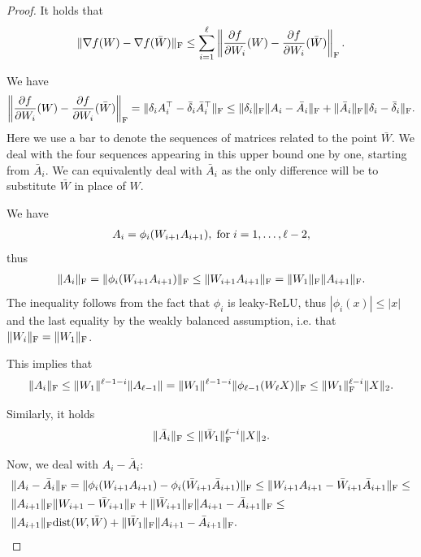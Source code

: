 \documentclass[a4paper,11pt]{article}
\newcommand{\1}{\mathbbm{1}}
\theoremstyle{plain}
\begin{document}
\begin{proof}
It holds that
\begin{equation*}
    \|\nabla f(W)-\nabla f(\bar W)\|_{\rm F} \leq \sum_{i=1}^{\ell} \left\|\frac{\partial f}{\partial W_i}(W)-\frac{\partial f}{\partial W_i}(\bar W) \right\|_{\rm F}.
\end{equation*}

We have
\begin{equation}
\label{eq:basic_bound_partial_derivatives}
    \left\|\frac{\partial f}{\partial W_i}(W)-\frac{\partial f}{\partial W_i}(\bar W) \right\|_{\rm F} = \|\delta_i A_i^\top - \bar \delta_i \bar A_i^\top\|_{\rm F} \leq \|\delta_i\|_{\rm F} \|A_i-\bar A_i\|_{\rm F}+\|\bar A_i\|_{\rm F} \|\delta_i-\bar \delta_i\|_{\rm F}.
\end{equation}
Here we use a bar to denote the sequences of matrices related to the point $\bar W$. We deal with the four sequences appearing in this upper bound one by one, starting from $\bar A_i$. We can equivalently deal with $\bar A_i$ as the only difference will be to substitute $\bar W$ in place of $W$.

We have
\begin{align*}
    A_i =  \phi_i(W_{i+1}A_{i+1}), \hspace{1mm} \text{for} \hspace{1mm} i=1, \dots ,\ell-2,
\end{align*}
 thus
\begin{align*}
    \|A_i\|_{\rm F} =  \|\phi_i(W_{i+1}A_{i+1})\|_{\rm F} \leq \|W_{i+1} A_{i+1}\|_{\rm F} = \|W_1\|_{\rm F} \|A_{i+1}\|_{\rm F}. 
\end{align*}
The inequality follows from the fact that $\phi_i$ is leaky-ReLU, thus $|\phi_i(x)| \leq |x|$ and the last equality by the weakly balanced assumption, i.e. that $\|W_i\|_{\rm F} = \|W_1\|_{\rm F}$.

This implies that
\begin{equation}
\label{eq:bound_A_i}
    \|A_i\|_{\rm F} \leq \|W_1\|^{\ell-1-i} \|A_{\ell-1}\| = \|W_1\|^{\ell-1-i} \|\phi_{\ell-1}(W_{\ell} X)\|_{\rm F} \leq \|W_1\|_{\rm F}^{\ell-i} \|X\|_2.
\end{equation}

Similarly, it holds
\begin{equation}
\label{eq:bar_A_i}
    \|\bar A_i\|_{\rm F} \leq \|\bar W_1\|_{\rm F}^{\ell-i} \|X\|_2.
\end{equation}

Now, we deal with $A_i-\bar A_i$:
\begin{align*}
    &\|A_i-\bar A_i\|_{\rm F} = \nonumber\|\phi_i(W_{i+1}A_{i+1}) - \phi_i(\bar W_{i+1} \bar A_{i+1}) \|_{\rm F} \leq \|W_{i+1}A_{i+1} - \bar W_{i+1} \bar A_{i+1}\|_{\rm F} \leq \\ & \|A_{i+1}\|_{\rm F} \|W_{i+1}-\bar W_{i+1}\|_{\rm F} + \|\bar W_{i+1}\|_{\rm F} \|A_{i+1} - \bar A_{i+1}\|_{\rm F}  \leq \\ & \|A_{i+1}\|_{\rm F} \textnormal{dist}(W,\bar W) + \|\bar W_1\|_{\rm F} \|A_{i+1}-\bar A_{i+1}\|_{\rm F}.
\end{align*}


\end{proof}
\end{document}
